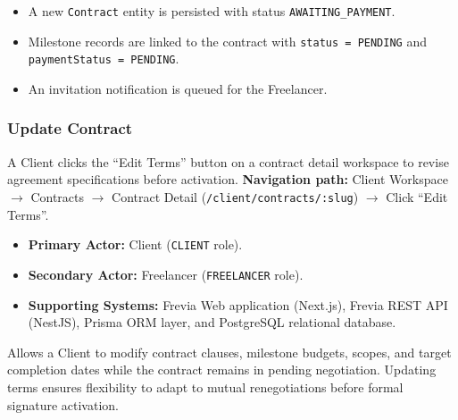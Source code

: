 \begin{itemize}[leftmargin=1.6em,topsep=3pt,itemsep=2pt,parsep=0pt,label=$\bullet$]
      \item A new \texttt{Contract} entity is persisted with status \texttt{AWAITING\_PAYMENT}.
      \item Milestone records are linked to the contract with \texttt{status = PENDING} and \texttt{paymentStatus = PENDING}.
      \item An invitation notification is queued for the Freelancer.
\end{itemize}

\subsubsection{ Update Contract}

A Client clicks the ``Edit Terms'' button on a contract detail workspace to revise agreement specifications before activation.\newline
\textbf{Navigation path:} Client Workspace $\rightarrow$ Contracts $\rightarrow$ Contract Detail (\texttt{/\allowbreak{}client/\allowbreak{}contracts/\allowbreak{}:\allowbreak{}slug}) $\rightarrow$ Click ``Edit Terms''.


\begin{itemize}[leftmargin=1.6em,topsep=3pt,itemsep=2pt,parsep=0pt,label=$\bullet$]
      \item \textbf{Primary Actor:} Client (\texttt{CLIENT} role).
      \item \textbf{Secondary Actor:} Freelancer (\texttt{FREELANCER} role).
      \item \textbf{Supporting Systems:} Frevia Web application (Next.js), Frevia REST API (NestJS), Prisma ORM layer, and PostgreSQL relational database.
\end{itemize}

\noindent Allows a Client to modify contract clauses, milestone budgets, scopes, and target completion dates while the contract remains in pending negotiation. Updating terms ensures flexibility to adapt to mutual renegotiations before formal signature activation.


